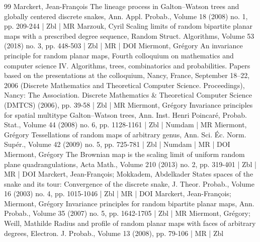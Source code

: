 \begin{thebibliography}{99}
Marckert, Jean-François The lineage process in Galton–Watson trees and globally centered discrete snakes, Ann. Appl. Probab., Volume 18 (2008) no. 1, pp. 209-244 | Zbl | MR
Marzouk, Cyril Scaling limits of random bipartite planar maps with a prescribed degree sequence, Random Struct. Algorithms, Volume 53 (2018) no. 3, pp. 448-503 | Zbl | MR | DOI
Miermont, Grégory An invariance principle for random planar maps, Fourth colloquium on mathematics and computer science IV. Algorithms, trees, combinatorics and probabilities. Papers based on the presentations at the colloquium, Nancy, France, September 18–22, 2006 (Discrete Mathematics and Theoretical Computer Science. Proceedings), Nancy: The Association. Discrete Mathematics \& Theoretical Computer Science (DMTCS) (2006), pp. 39-58 | Zbl | MR
Miermont, Grégory Invariance principles for spatial multitype Galton–Watson trees, Ann. Inst. Henri Poincaré, Probab. Stat., Volume 44 (2008) no. 6, pp. 1128-1161 | Zbl | Numdam | MR
Miermont, Grégory Tessellations of random maps of arbitrary genus, Ann. Sci. Éc. Norm. Supér., Volume 42 (2009) no. 5, pp. 725-781 | Zbl | Numdam | MR | DOI
Miermont, Grégory The Brownian map is the scaling limit of uniform random plane quadrangulations, Acta Math., Volume 210 (2013) no. 2, pp. 319-401 | Zbl | MR | DOI
Marckert, Jean-François; Mokkadem, Abdelkader States spaces of the snake and its tour: Convergence of the discrete snake, J. Theor. Probab., Volume 16 (2003) no. 4, pp. 1015-1046 | Zbl | MR | DOI
Marckert, Jean-François; Miermont, Grégory Invariance principles for random bipartite planar maps, Ann. Probab., Volume 35 (2007) no. 5, pp. 1642-1705 | Zbl | MR
Miermont, Grégory; Weill, Mathilde Radius and profile of random planar maps with faces of arbitrary degrees, Electron. J. Probab., Volume 13 (2008), pp. 79-106 | MR | Zbl
\end{thebibliography}
